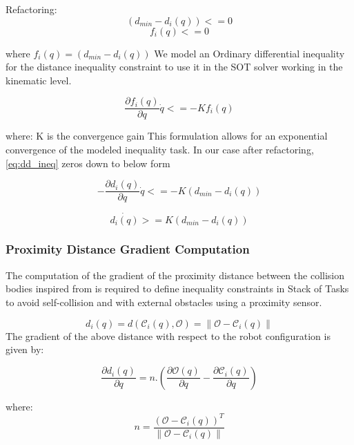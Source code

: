 Refactoring:
\[ (d_{min} - d_i(q))  <= 0\] 
\begin{equation} \label{eq:d_ineq} 
f_i(q)  <= 0
\end{equation} 

where $ f_i(q) = (d_{min} - d_i(q))$
\newline
We model an Ordinary differential inequality for the distance inequality constraint to use it in the SOT solver working in the kinematic level. 

\begin{equation} \label{eq:dd_ineq} 
\frac{\partial f_i(q) }{\partial q} \dot{q} <= - K f_i(q)
\end{equation} 

where: K is the convergence gain\newline
This formulation allows for an exponential convergence of the modeled inequality task. In our case after refactoring, \ref{eq:dd_ineq} zeros down to below form

\begin{equation} \label{eq:solver} 
-\frac{\partial d_i(q) }{\partial q}  \dot{q} <= -K (d_{min} - d_i(q))
\end{equation} 

\begin{equation} \label{eq:final} 
\dot{d_i(q)} >= K (d_{min} - d_i(q))
\end{equation}
\subsubsection{Proximity Distance Gradient Computation}
The computation of the gradient of the proximity distance between the collision bodies inspired from \cite{lefebvre2005fast} is required to define inequality constraints in Stack of Tasks to avoid self-collision and with external obstacles using a proximity sensor.

\begin{equation} \label{eq:proxd}
d_i(q) = d(\mathcal{C}_{i}(q),\mathcal{O}) = \|\mathcal{O} - \mathcal{C}_{i}(q) \|
\end{equation}
The gradient of the above distance with respect to the robot configuration is given by:

\[ \frac{\partial d_i(q) }{\partial q} = n.(\frac{\partial \mathcal{O}(q) }{\partial q}-\frac{\partial \mathcal{C}_{i}(q) }{\partial q}) \] 

where: 
\[ n = \frac{(\mathcal{O} - \mathcal{C}_{i}(q))^T}{ \|\mathcal{O} - \mathcal{C}_{i}(q) \| }\]

